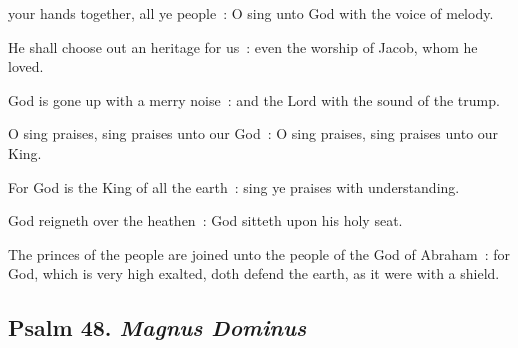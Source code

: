 
 your hands together, all ye people~: O sing unto God with the voice of melody.\par
{}
He shall choose out an heritage for us~: even the worship of Jacob, whom he loved.\par
{}God is gone up with a merry noise~: and the Lord with the sound of the trump.\par
{}O sing praises, sing praises unto our God~: O sing praises, sing praises unto our King.\par
{}For God is the King of all the earth~: sing ye praises with understanding.\par
{}God reigneth over the heathen~: God sitteth upon his holy seat.\par
{}The princes of the people are joined unto the people of the God of Abraham~: for God, which is very high exalted, doth defend the earth, as it were with a shield.\par


\clearpage
\subsection{Psalm 48. \textit{Magnus Dominus}}


